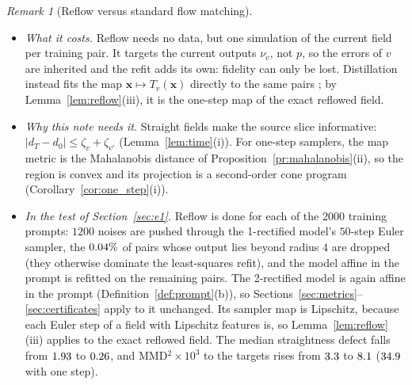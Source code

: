\documentclass{article}
\DeclareMathOperator{\E}{\mathbb{E}}
\newcommand{\bx}{\mathbf{x}}
\theoremstyle{plain}
\theoremstyle{remark}
\newtheorem{remark}[theorem]{Remark}
\begin{document}
\begin{remark}[Reflow versus standard flow matching]
\begin{itemize}
training pairs. Third, a coupling is unchanged by this operation if and only if its segments do not cross, and
optimal transport couplings for strictly convex costs are such fixed points; in dimension one, flows cannot cross, so one
reflow of an exact flow gives a straight one. Fourth, among the first $k$ rectified flows, the smallest sum of straightness
defect and crossing is at most $\E\|\bx_1-\bx_0\|^2/k$ for the initial pairs. For $c=\|\cdot\|^2$, an exact identity underlies these results:
$\E\|\bx_1-\bx_0\|^2$ over the training pairs minus $\E\|Z_1-Z_0\|^2$ equals the crossing of the training pairs plus the curvature
$\int_0^1\E\|\dot Z_t-(Z_1-Z_0)\|^2dt$ of the learned flow. On the ring, with independent training pairs, $\E\|\bx_1-\bx_0\|^2$ falls from $\rfCostInd$ to
$\rfCostRefl$, a decrease of $\rfDecrease$, against a crossing of $\rfVind$ plus a curvature of $\rfCurv$, that is $\rfSum$; the gap is discretisation error.
\item \emph{What it costs.} Reflow needs no data, but one simulation of the current field per training pair. It targets
the current outputs $\nu_v$, not $p$, so the errors of $v$ are inherited and the refit adds its own: fidelity can only be lost.
Distillation instead fits the map $\bx\mapsto T_v(\bx)$ directly to the same pairs \citep{liu2024instaflow}; by Lemma~\ref{lem:reflow}(iii),
it is the one-step map of the exact reflowed field.
\item \emph{Why this note needs it.} Straight fields make the source slice informative: $|d_T-d_0|\le\zeta_v+\zeta_{v'}$
(Lemma~\ref{lem:time}(i)). For one-step samplers, the map metric is the Mahalanobis distance of Proposition~\ref{pr:mahalanobis}(ii), so
the region is convex and its projection is a second-order cone program (Corollary~\ref{cor:one_step}(i)).
\item \emph{In the test of Section~\ref{sec:e1}.} Reflow is done for each of the $2000$ training prompts: $1200$ noises are pushed
through the 1-rectified model's $50$-step Euler sampler, the $0.04\%$ of pairs whose output lies beyond radius $4$
are dropped (they otherwise dominate the least-squares refit), and the model affine in the prompt is refitted on
the remaining pairs. The 2-rectified model is again affine in the prompt (Definition~\ref{def:prompt}(b)), so
Sections~\ref{sec:metrics}--\ref{sec:certificates} apply to it unchanged. Its sampler map is Lipschitz, because each Euler step of a
field with Lipschitz features is, so Lemma~\ref{lem:reflow}(iii) applies to the exact reflowed field. The median straightness
defect falls from $1.93$ to $0.26$, and MMD$^2\times10^3$ to the targets rises from $3.3$ to $8.1$ ($34.9$ with one step).
\end{itemize}
\end{remark}
\end{document}
